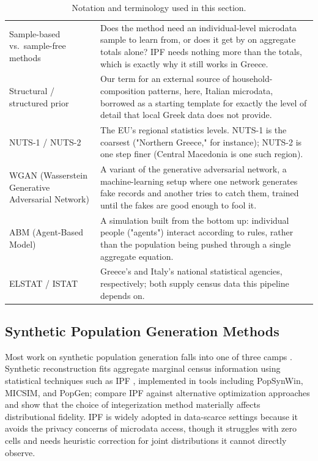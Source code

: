 \documentclass{article}
\begin{document}
\begin{table}[htbp]
\begin{tabularx}{\textwidth}{@{}l L@{}}
Sample-based vs.\ sample-free methods & Does the method need an individual-level microdata sample to learn from, or does it get by on aggregate totals alone? IPF needs nothing more than the totals, which is exactly why it still works in Greece. \\
Structural / structured prior & Our term for an external source of household-composition patterns, here, Italian microdata, borrowed as a starting template for exactly the level of detail that local Greek data does not provide. \\
NUTS-1 / NUTS-2 & The EU's regional statistics levels. NUTS-1 is the coarsest ("Northern Greece," for instance); NUTS-2 is one step finer (Central Macedonia is one such region). \\
WGAN (Wasserstein Generative Adversarial Network) & A variant of the generative adversarial network, a machine-learning setup where one network generates fake records and another tries to catch them, trained until the fakes are good enough to fool it. \\
ABM (Agent-Based Model) & A simulation built from the bottom up: individual people ("agents") interact according to rules, rather than the population being pushed through a single aggregate equation. \\
ELSTAT / ISTAT & Greece's and Italy's national statistical agencies, respectively; both supply census data this pipeline depends on. \\
\bottomrule
\end{tabularx}
\caption{Notation and terminology used in this section.}
\label{tab:notation}
\end{table}

\subsection{Synthetic Population Generation Methods}\label{synthetic-population-generation-methods}

Most work on synthetic population generation falls into one of three camps \citep{La2025}. Synthetic reconstruction fits aggregate marginal census information using statistical techniques such as IPF \citep{beckman1996creating, deming1940least}, implemented in tools including PopSynWin, MICSIM, and PopGen; \citet{DURANHERAS201878} compare IPF against alternative optimization approaches and show that the choice of integerization method materially affects distributional fidelity. IPF is widely adopted in data-scarce settings because it avoids the privacy concerns of microdata access, though it struggles with zero cells and needs heuristic correction for joint distributions it cannot directly observe.
\end{document}
